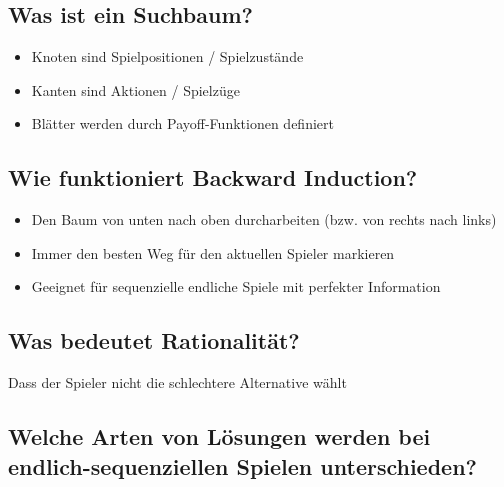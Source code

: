 \documentclass[a4paper]{article}
\begin{document}
		\subsection{Was ist ein Suchbaum?}
		
		\begin{itemize}
			\item Knoten sind Spielpositionen / Spielzustände
			\item Kanten sind Aktionen / Spielzüge
			\item Blätter werden durch Payoff-Funktionen definiert
		\end{itemize}
	
		\subsection{Wie funktioniert Backward Induction?}
		
		\begin{itemize}
			\item Den Baum von unten nach oben durcharbeiten (bzw. von rechts nach links)
			\item Immer den besten Weg für den aktuellen Spieler markieren
			\item Geeignet für sequenzielle endliche Spiele mit perfekter Information
		\end{itemize}
		
		\subsection{Was bedeutet Rationalität?}
		
		Dass der Spieler nicht die schlechtere Alternative wählt
		
		\subsection{Welche Arten von Lösungen werden bei endlich-sequenziellen Spielen unterschieden?}
		
\end{document}
